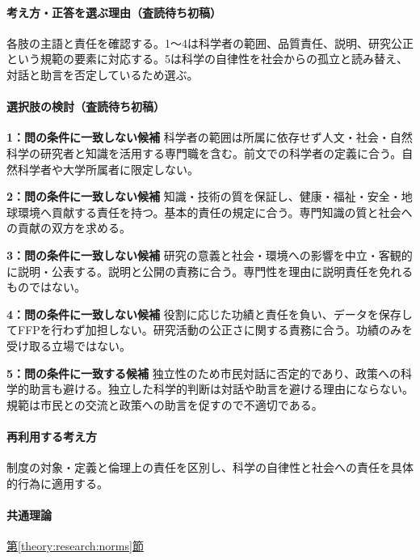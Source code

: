 \paragraph{考え方・正答を選ぶ理由（査読待ち初稿）} 各肢の主語と責任を確認する。1〜4は科学者の範囲、品質責任、説明、研究公正という規範の要素に対応する。5は科学の自律性を社会からの孤立と読み替え、対話と助言を否定しているため選ぶ。

\paragraph{選択肢の検討（査読待ち初稿）}\mbox{}\par

\noindent\textbf{1：問の条件に一致しない候補} 科学者の範囲は所属に依存せず人文・社会・自然科学の研究者と知識を活用する専門職を含む。前文での科学者の定義に合う。自然科学者や大学所属者に限定しない。\par

\noindent\textbf{2：問の条件に一致しない候補} 知識・技術の質を保証し、健康・福祉・安全・地球環境へ貢献する責任を持つ。基本的責任の規定に合う。専門知識の質と社会への貢献の双方を求める。\par

\noindent\textbf{3：問の条件に一致しない候補} 研究の意義と社会・環境への影響を中立・客観的に説明・公表する。説明と公開の責務に合う。専門性を理由に説明責任を免れるものではない。\par

\noindent\textbf{4：問の条件に一致しない候補} 役割に応じた功績と責任を負い、データを保存してFFPを行わず加担しない。研究活動の公正さに関する責務に合う。功績のみを受け取る立場ではない。\par

\noindent\textbf{5：問の条件に一致する候補} 独立性のため市民対話に否定的であり、政策への科学的助言も避ける。独立した科学的判断は対話や助言を避ける理由にならない。規範は市民との交流と政策への助言を促すので不適切である。\par

\paragraph{再利用する考え方} 制度の対象・定義と倫理上の責任を区別し、科学の自律性と社会への責任を具体的行為に適用する。

\paragraph{共通理論} \hyperref[theory:research:norms]{第\ref*{theory:research:norms}節}

